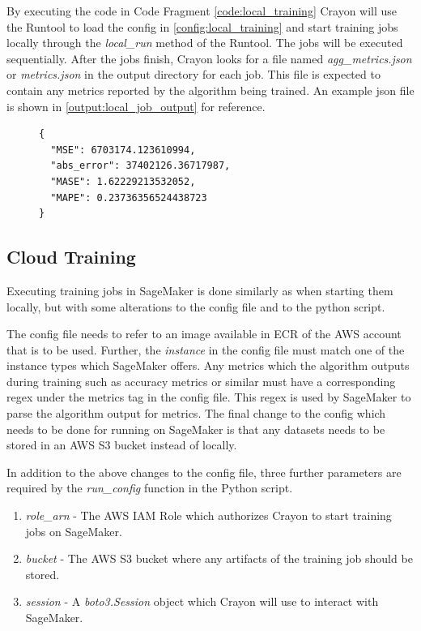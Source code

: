 By executing the code in Code Fragment \ref{code:local_training} Crayon will use the Runtool to load the config in \ref{config:local_training} and start training jobs locally through the \textit{local\_run} method of the Runtool. The jobs will be executed sequentially. After the jobs finish, Crayon looks for a file named \textit{agg\_metrics.json} or \textit{metrics.json} in the output directory for each job. This file is expected to contain any metrics reported by the algorithm being trained. An example json file is shown in \ref{output:local_job_output} for reference.

\begin{figure}
  \begin{lstlisting}[label={output:local_job_output}, caption=Example of a training job output file such as \textit{metrics.json} or \textit{agg\_metrics.json}]
{
  "MSE": 6703174.123610994,
  "abs_error": 37402126.36717987,
  "MASE": 1.62229213532052,
  "MAPE": 0.23736356524438723
}
\end{lstlisting}
\end{figure}


\subsection{Cloud Training}
\label{sec:cloud_training}
Executing training jobs in SageMaker is done similarly as when starting them locally, but with some alterations to the config file and to the python script.

The config file needs to refer to an image available in ECR of the AWS account that is to be used. Further, the \textit{instance} in the config file must match one of the instance types which SageMaker offers. Any metrics which the algorithm outputs during training such as accuracy metrics or similar must have a corresponding regex under the metrics tag in the config file. This regex is used by SageMaker to parse the algorithm output for metrics. The final change to the config which needs to be done for running on SageMaker is that any datasets needs to be stored in an AWS S3 bucket instead of locally.

In addition to the above changes to the config file, three further parameters are required by the \textit{run\_config} function in the Python script.

\begin{enumerate}
  \item \textit{role\_arn} - The AWS IAM Role  which authorizes Crayon to start training jobs on SageMaker.
  \item \textit{bucket} - The AWS S3 bucket where any artifacts of the training job should be stored.
  \item \textit{session} - A \textit{boto3.Session} object which Crayon will use to interact with SageMaker.
\end{enumerate}

